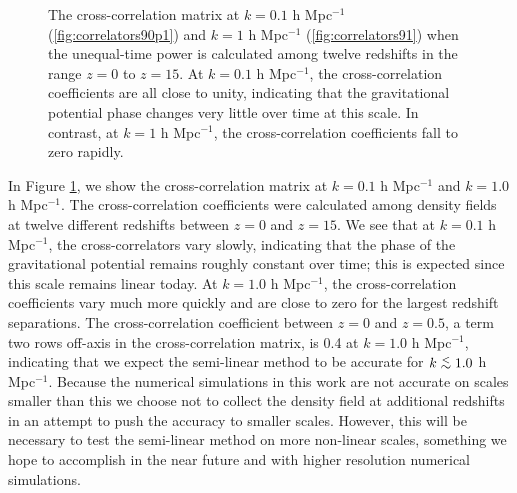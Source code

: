 \documentclass[twocolumn,superscriptaddress,prd]{revtex4}
\def\ltsima{$\; \buildrel < \over \sim \;$}
\def\lsim{\lower.5ex\hbox{\ltsima}}
\begin{document}
\begin{figure}[h!]
  \centering
  \caption{The cross-correlation matrix at $k=0.1$ h Mpc$^{-1}$
      (\ref{fig:correlators90p1}) and  $k=1$ h Mpc$^{-1}$
      (\ref{fig:correlators91}) when
      the unequal-time power is calculated among twelve redshifts
      in the range $z=0$ to $z=15$.  At $k=0.1$ h Mpc$^{-1}$, the
      cross-correlation coefficients are all close to unity, indicating
      that the gravitational potential phase changes very little over
      time at this scale.
      In contrast, at $k=1$ h Mpc$^{-1}$, the cross-correlation
      coefficients fall to zero rapidly.}\label{fig:correlators}
\end{figure}


In Figure \ref{fig:correlators}, we show the cross-correlation matrix
at $k=0.1$ h Mpc$^{-1}$ and $k=1.0$ h Mpc$^{-1}$.  The
cross-correlation coefficients were calculated among density fields at
twelve different redshifts between $z=0$ and $z=15$.
We see that at
$k=0.1$ h Mpc$^{-1}$, the cross-correlators vary slowly,
indicating that the phase of the gravitational potential remains
roughly constant over time; this is expected since this scale
remains linear today.  At $k=1.0$ h Mpc$^{-1}$, the
cross-correlation coefficients vary much more quickly and are
close to zero for the largest redshift separations.  The cross-correlation coefficient between $z=0$ and $z=0.5$, a term
two rows off-axis in the cross-correlation matrix, is 0.4 at $k=1.0$
h Mpc$^{-1}$, indicating
that we expect the semi-linear method to be
accurate for $k \lsim 1.0$ h Mpc$^{-1}$.  Because the numerical
simulations in this work
are not accurate on scales smaller than this we choose not to 
collect the density field at
additional redshifts in an attempt to push the accuracy to smaller
scales.  However, this will be necessary to test 
the semi-linear method on more non-linear scales, something we hope to accomplish
in the near future and with higher resolution numerical simulations.
\end{document}
